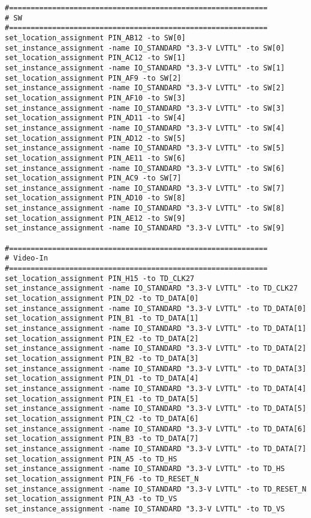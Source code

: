 \documentclass[dvipdfm]{book}
\begin{document}
\begin{verbatim}
#============================================================
# SW
#============================================================
set_location_assignment PIN_AB12 -to SW[0]
set_instance_assignment -name IO_STANDARD "3.3-V LVTTL" -to SW[0]
set_location_assignment PIN_AC12 -to SW[1]
set_instance_assignment -name IO_STANDARD "3.3-V LVTTL" -to SW[1]
set_location_assignment PIN_AF9 -to SW[2]
set_instance_assignment -name IO_STANDARD "3.3-V LVTTL" -to SW[2]
set_location_assignment PIN_AF10 -to SW[3]
set_instance_assignment -name IO_STANDARD "3.3-V LVTTL" -to SW[3]
set_location_assignment PIN_AD11 -to SW[4]
set_instance_assignment -name IO_STANDARD "3.3-V LVTTL" -to SW[4]
set_location_assignment PIN_AD12 -to SW[5]
set_instance_assignment -name IO_STANDARD "3.3-V LVTTL" -to SW[5]
set_location_assignment PIN_AE11 -to SW[6]
set_instance_assignment -name IO_STANDARD "3.3-V LVTTL" -to SW[6]
set_location_assignment PIN_AC9 -to SW[7]
set_instance_assignment -name IO_STANDARD "3.3-V LVTTL" -to SW[7]
set_location_assignment PIN_AD10 -to SW[8]
set_instance_assignment -name IO_STANDARD "3.3-V LVTTL" -to SW[8]
set_location_assignment PIN_AE12 -to SW[9]
set_instance_assignment -name IO_STANDARD "3.3-V LVTTL" -to SW[9]

#============================================================
# Video-In
#============================================================
set_location_assignment PIN_H15 -to TD_CLK27
set_instance_assignment -name IO_STANDARD "3.3-V LVTTL" -to TD_CLK27
set_location_assignment PIN_D2 -to TD_DATA[0]
set_instance_assignment -name IO_STANDARD "3.3-V LVTTL" -to TD_DATA[0]
set_location_assignment PIN_B1 -to TD_DATA[1]
set_instance_assignment -name IO_STANDARD "3.3-V LVTTL" -to TD_DATA[1]
set_location_assignment PIN_E2 -to TD_DATA[2]
set_instance_assignment -name IO_STANDARD "3.3-V LVTTL" -to TD_DATA[2]
set_location_assignment PIN_B2 -to TD_DATA[3]
set_instance_assignment -name IO_STANDARD "3.3-V LVTTL" -to TD_DATA[3]
set_location_assignment PIN_D1 -to TD_DATA[4]
set_instance_assignment -name IO_STANDARD "3.3-V LVTTL" -to TD_DATA[4]
set_location_assignment PIN_E1 -to TD_DATA[5]
set_instance_assignment -name IO_STANDARD "3.3-V LVTTL" -to TD_DATA[5]
set_location_assignment PIN_C2 -to TD_DATA[6]
set_instance_assignment -name IO_STANDARD "3.3-V LVTTL" -to TD_DATA[6]
set_location_assignment PIN_B3 -to TD_DATA[7]
set_instance_assignment -name IO_STANDARD "3.3-V LVTTL" -to TD_DATA[7]
set_location_assignment PIN_A5 -to TD_HS
set_instance_assignment -name IO_STANDARD "3.3-V LVTTL" -to TD_HS
set_location_assignment PIN_F6 -to TD_RESET_N
set_instance_assignment -name IO_STANDARD "3.3-V LVTTL" -to TD_RESET_N
set_location_assignment PIN_A3 -to TD_VS
set_instance_assignment -name IO_STANDARD "3.3-V LVTTL" -to TD_VS


\end{verbatim}
\end{document}
